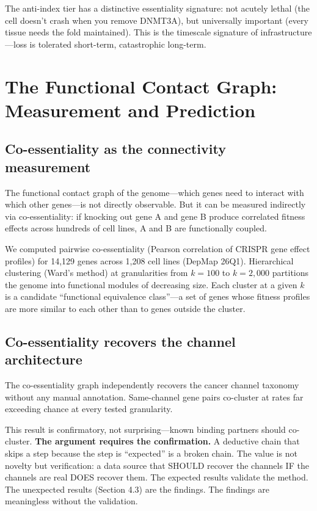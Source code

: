 \documentclass[11pt]{article}
\theoremstyle{definition}
\begin{document}
The anti-index tier has a distinctive essentiality signature: not acutely lethal (the cell doesn't crash when you remove DNMT3A), but universally important (every tissue needs the fold maintained). This is the timescale signature of infrastructure---loss is tolerated short-term, catastrophic long-term.

\section{The Functional Contact Graph: Measurement and Prediction}

\subsection{Co-essentiality as the connectivity measurement}

The functional contact graph of the genome---which genes need to interact with which other genes---is not directly observable. But it can be measured indirectly via co-essentiality: if knocking out gene A and gene B produce correlated fitness effects across hundreds of cell lines, A and B are functionally coupled.

We computed pairwise co-essentiality (Pearson correlation of CRISPR gene effect profiles) for 14,129 genes across 1,208 cell lines (DepMap 26Q1). Hierarchical clustering (Ward's method) at granularities from $k{=}100$ to $k{=}2{,}000$ partitions the genome into functional modules of decreasing size. Each cluster at a given $k$ is a candidate ``functional equivalence class''---a set of genes whose fitness profiles are more similar to each other than to genes outside the cluster.

\subsection{Co-essentiality recovers the channel architecture}

The co-essentiality graph independently recovers the cancer channel taxonomy without any manual annotation. Same-channel gene pairs co-cluster at rates far exceeding chance at every tested granularity.

This result is confirmatory, not surprising---known binding partners should co-cluster. \textbf{The argument requires the confirmation.} A deductive chain that skips a step because the step is ``expected'' is a broken chain. The value is not novelty but verification: a data source that SHOULD recover the channels IF the channels are real DOES recover them. The expected results validate the method. The unexpected results (Section 4.3) are the findings. The findings are meaningless without the validation.
\end{document}
